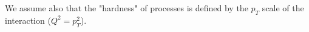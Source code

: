 
\noindent We assume also that the "hardness" of processes is defined by the $p_T$ scale of the interaction ($Q^2=p_T^2$).


